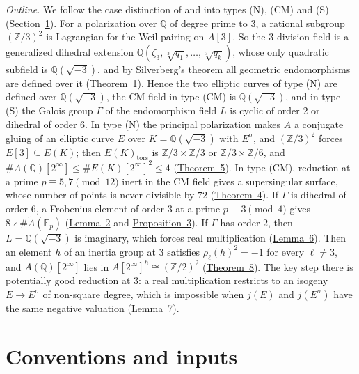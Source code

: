 \documentclass[11pt]{article}
\newcommand{\Q}{\mathbb Q}
\newcommand{\Z}{\mathbb Z}
\newcommand{\F}{\mathbb F}
\begin{document}
\emph{Outline.} We follow the case distinction of \cite{P63} and \cite{P2214} into types (N), (CM) and (S)
(Section~\ref{inputs}). For a polarization over \(\Q\) of degree prime to \(3\), a rational subgroup
\((\Z/3)^2\) is Lagrangian for the Weil pairing on \(A[3]\). So the \(3\)-division field is a generalized
dihedral extension \(\Q(\zeta_3,\sqrt[3]{q_1},\dots,\sqrt[3]{q_k})\), whose only quadratic subfield is
\(\Q(\sqrt{-3})\), and by Silverberg's theorem all geometric endomorphisms are defined over it
(\hyperref[thm-full3]{Theorem~1}). Hence the two elliptic curves of type (N) are defined over
\(\Q(\sqrt{-3})\), the CM field in type (CM) is \(\Q(\sqrt{-3})\), and in type (S) the Galois group \(\Gamma\) of
the endomorphism field \(L\) is cyclic of order \(2\) or dihedral of order \(6\). In type (N) the principal
polarization makes \(A\) a conjugate gluing of an elliptic curve \(E\) over \(K=\Q(\sqrt{-3})\) with \(E^\sigma\),
and \((\Z/3)^2\) forces \(E[3]\subseteq E(K)\); then \(E(K)_{\mathrm{tors}}\) is \(\Z/3\times\Z/3\) or
\(\Z/3\times\Z/6\), and \(\#A(\Q)[2^\infty]\le\#E(K)[2^\infty]^2\le4\) (\hyperref[thm-N]{Theorem~5}). In type
(CM), reduction at a prime \(p\equiv5,7\pmod{12}\) inert in the CM field gives a supersingular surface, whose
number of points is never divisible by \(72\) (\hyperref[thm-cm]{Theorem~4}). If \(\Gamma\) is dihedral of order
\(6\), a Frobenius element of order \(3\) at a prime \(p\equiv3\pmod4\) gives
\(8\nmid\#\widetilde A(\F_p)\) (\hyperref[lemma-shapes]{Lemma~2} and \hyperref[prop-ord3]{Proposition~3}). If
\(\Gamma\) has order \(2\), then \(L=\Q(\sqrt{-3})\) is imaginary, which forces real multiplication
(\hyperref[lemma-rm]{Lemma~6}). Then an element \(h\) of an inertia group at \(3\) satisfies
\(\rho_\ell(h)^2=-1\) for every \(\ell\neq3\), and \(A(\Q)[2^\infty]\) lies in \(A[2^\infty]^h\cong(\Z/2)^2\)
(\hyperref[thm-inertia]{Theorem~8}). The key step there is potentially good reduction at \(3\): a real
multiplication restricts to an isogeny \(E\to E^\sigma\) of non-square degree, which is impossible when
\(j(E)\) and \(j(E^\sigma)\) have the same negative valuation (\hyperref[lemma-tate]{Lemma~7}).

\section{Conventions and inputs}\label{inputs}
\end{document}
